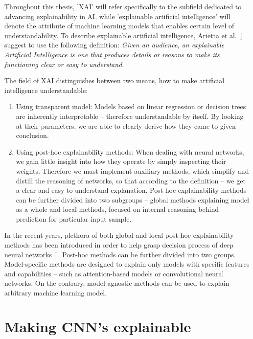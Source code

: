 
Throughout this thesis, 'XAI' will refer specifically to the subfield dedicated to advancing explainability in AI, while 'explainable artificial intelligence' will denote the attribute of machine learning models that enables certain level of understandability. To describe explainable artificial intelligence, Arietta et al. [] suggest to use the following definition: \emph{Given an audience, an explainable Artificial Intelligence is one that produces details or reasons to make its functioning clear or easy to understand}.\newline

\noindent
The field of XAI distinguishes between two means, how to make artificial intelligence understandable:

\begin{enumerate}
    \item Using transparent model: Models based on linear regression or decision trees are inherently interpretable -- therefore understandable by itself. By looking at their parameters, we are able to clearly derive how they came to given conclusion.
    \item Using post-hoc explainability methods: When dealing with neural networks, we gain little insight into how they operate by simply inspecting their weights. Therefore we must implement auxiliary methods, which simplify and distill the reasoning of networks, so that according to the definition -- we get a clear and easy to understand explanation. Post-hoc explainability methods can be further divided into two subgroups -- global methods explaining model as a whole and local methods, focused on internal reasoning behind prediction for particular input sample.
\end{enumerate}

In the recent years, plethora of both global and local post-hoc explainability methods has been introduced in order to help grasp decision process of deep neural networks []. Post-hoc methods can be further divided into two groups. Model-specific methods are designed to explain only models with specific features and capabilities -- such as attention-based models or convolutional neural networks. On the contrary, model-agnostic methods can be used to explain arbitrary machine learning model.

\section{Making CNN's explainable}

